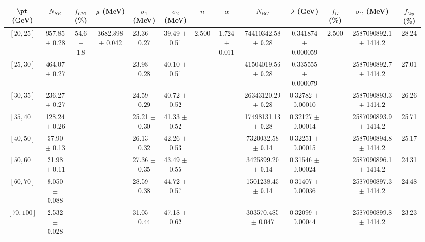 \begin{tabular}{c||c|c|c|c|c|c|c|c|c|c|c||c}
$\pt$ (GeV) & $N_{SR}$ & $f_{CB1}$ (\%) & $\mu$ (MeV) & $\sigma_1$ (MeV) & $\sigma_2$ (MeV) & $n$ & $\alpha$ & $N_{BG}$ & $\lambda$ (GeV) & $f_G$ (\%) & $\sigma_G$ (MeV) & $f_{bkg}$ (\%) \\
\hline
$[20, 25]$ & 957.85 $\pm$ 0.28 & \multirow{8}{*}{54.6 $\pm$ 1.8} & \multirow{8}{*}{3682.898 $\pm$ 0.042} & 23.36 $\pm$ 0.27 & 39.49 $\pm$ 0.51 & \multirow{8}{*}{2.500} & \multirow{8}{*}{1.724 $\pm$ 0.011} & 74410342.58 $\pm$ 0.28 & 0.341874 $\pm$ 0.000059 & \multirow{8}{*}{2.500} & 2587090892.1 $\pm$ 1414.2 & 28.24\\
$[25, 30]$ & 464.07 $\pm$ 0.27 &  &  & 23.98 $\pm$ 0.28 & 40.10 $\pm$ 0.51 &  &  & 41504019.56 $\pm$ 0.28 & 0.335555 $\pm$ 0.000079 &  & 2587090892.7 $\pm$ 1414.2 & 27.01\\
$[30, 35]$ & 236.27 $\pm$ 0.27 &  &  & 24.59 $\pm$ 0.29 & 40.72 $\pm$ 0.52 &  &  & 26343120.29 $\pm$ 0.28 & 0.32782 $\pm$ 0.00010 &  & 2587090893.3 $\pm$ 1414.2 & 26.26\\
$[35, 40]$ & 128.24 $\pm$ 0.26 &  &  & 25.21 $\pm$ 0.30 & 41.33 $\pm$ 0.52 &  &  & 17498131.13 $\pm$ 0.28 & 0.32127 $\pm$ 0.00014 &  & 2587090893.9 $\pm$ 1414.2 & 25.71\\
$[40, 50]$ & 57.90 $\pm$ 0.13 &  &  & 26.13 $\pm$ 0.32 & 42.26 $\pm$ 0.53 &  &  & 7320032.58 $\pm$ 0.14 & 0.32251 $\pm$ 0.00015 &  & 2587090894.8 $\pm$ 1414.2 & 25.17\\
$[50, 60]$ & 21.98 $\pm$ 0.11 &  &  & 27.36 $\pm$ 0.35 & 43.49 $\pm$ 0.55 &  &  & 3425899.20 $\pm$ 0.14 & 0.31546 $\pm$ 0.00024 &  & 2587090896.1 $\pm$ 1414.2 & 24.31\\
$[60, 70]$ & 9.050 $\pm$ 0.088 &  &  & 28.59 $\pm$ 0.38 & 44.72 $\pm$ 0.57 &  &  & 1501238.43 $\pm$ 0.14 & 0.31407 $\pm$ 0.00036 &  & 2587090897.3 $\pm$ 1414.2 & 24.48\\
$[70, 100]$ & 2.532 $\pm$ 0.028 &  &  & 31.05 $\pm$ 0.44 & 47.18 $\pm$ 0.62 &  &  & 303570.485 $\pm$ 0.047 & 0.32099 $\pm$ 0.00044 &  & 2587090899.8 $\pm$ 1414.2 & 23.23\\
\end{tabular}
